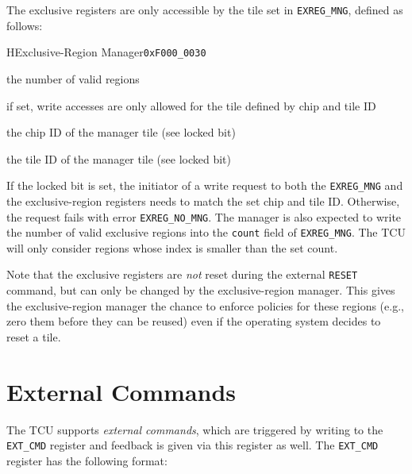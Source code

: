 The exclusive registers are only accessible by the tile set in \texttt{EXREG\_MNG}, defined as
follows:
\setlength{\regWidth}{.95\textwidth}
\begin{register}{H}{Exclusive-Region Manager}{\texttt{0xF000\_0030}}
  \regnewline%
  \begin{regdesc}\begin{reglist}
    \item[count] the number of valid regions
    \item[locked] if set, write accesses are only allowed for the tile defined by chip and tile ID
    \item[chip] the chip ID of the manager tile (see locked bit)
    \item[tile] the tile ID of the manager tile (see locked bit)
  \end{reglist}\end{regdesc}
\end{register}
\setlength{\regWidth}{\textwidth}

\noindent If the locked bit is set, the initiator of a write request to both the \texttt{EXREG\_MNG}
and the exclusive-region registers needs to match the set chip and tile ID. Otherwise, the request
fails with error \texttt{EXREG\_NO\_MNG}. The manager is also expected to write the number of valid
exclusive regions into the \texttt{count} field of \texttt{EXREG\_MNG}. The TCU will only consider
regions whose index is smaller than the set count.

Note that the exclusive registers are \emph{not} reset during the external \texttt{RESET} command,
but can only be changed by the exclusive-region manager. This gives the exclusive-region manager the
chance to enforce policies for these regions (e.g., zero them before they can be reused) even if the
operating system decides to reset a tile.
\extend{}

\section{External Commands}

The TCU supports \emph{external commands}, which are triggered by writing to the \texttt{EXT\_CMD}
register and feedback is given via this register as well. The \texttt{EXT\_CMD} register has the
following format:

